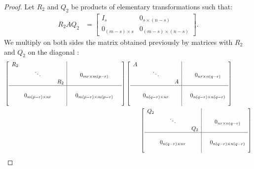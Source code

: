 \documentclass[11pt]{article}
\begin{document}
\begin{proof}
Let $R_2$ and $Q_2$ be products of elementary transformations such that:
\begin{align*}
    R_2AQ_2 &=\begin{bmatrix}
    I_s & 0_{s\times(n-s)}\\
    0_{(m-s)\times s} & 0_{(m-s)\times (n-s)}
    \end{bmatrix}.
\end{align*}
We multiply on both sides the matrix obtained previously by matrices with $R_2$ and $Q_2$ on the diagonal :
\begin{align*}
    &\begin{bmatrix}
    \begin{array}{c c c|c c c}
    R_2 & & & & \\
    & \ddots & & & 0_{mr \times m(p-r)} \\
    & & R_2 & &  \\
    \hline
    & & & & &\\
    & 0_{m(p-r) \times nr} & & & 0_{m(p-r) \times m(p-r)} \\
    & & & & 
    \end{array}
    \end{bmatrix}
    \begin{bmatrix}
    \begin{array}{c c c|c c c}
    A & & & & \\
    & \ddots & & & 0_{nr \times n(q-r)} \\
    & & A & &  \\
    \hline
    & & & & \\
    & 0_{n(q-r) \times nr} & & & 0_{n(q-r) \times n(q-r)} \\
    & & & & 
    \end{array}
    \end{bmatrix}\\
    &\qquad\qquad\qquad\qquad\qquad\qquad\qquad\qquad\qquad\qquad\qquad\qquad
    \begin{bmatrix}
    \begin{array}{ccc|ccc}
    Q_2 & & & & \\
    & \ddots & & & 0_{nr \times n(q-r)} \\
    & & Q_2 & & \\
    \hline
    & & & &\\
    & 0_{n(q-r) \times nr} & & & 0_{n(q-r) \times n(q-r)}\\
    & & & &
    \end{array}
    \end{bmatrix}\\

\end{align*}
\end{proof}
\end{document}
